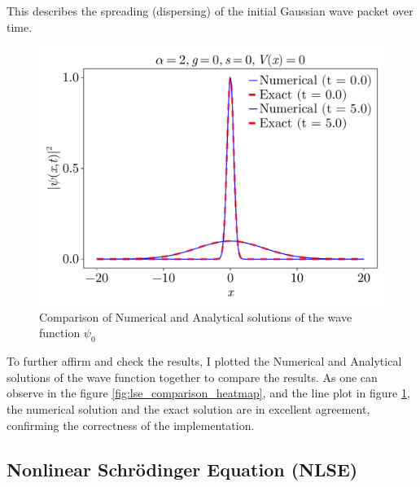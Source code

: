 \documentclass[8pt, a4paper, twocolumn]{article}
\begin{document}
This describes the spreading (dispersing) of the initial Gaussian wave packet over time.
\begin{figure}[h!]
	\centering
	\includegraphics[width=\linewidth]{../figs/lse_comparison_lineplot.pdf}
	\caption{Comparison of Numerical and Analytical solutions of the wave function $\psi_0$}
	\label{fig:lse_comparison_lineplot}
\end{figure}

To further affirm and check the results, I plotted the Numerical and Analytical solutions of the wave 
function together to compare the results. As one can observe in the figure 
\ref{fig:lse_comparison_heatmap}, and the line plot in figure \ref{fig:lse_comparison_lineplot}, 
the numerical solution and the exact solution are in excellent agreement, confirming the 
correctness of the implementation.


\subsection{Nonlinear Schrödinger Equation (NLSE)}
\end{document}
